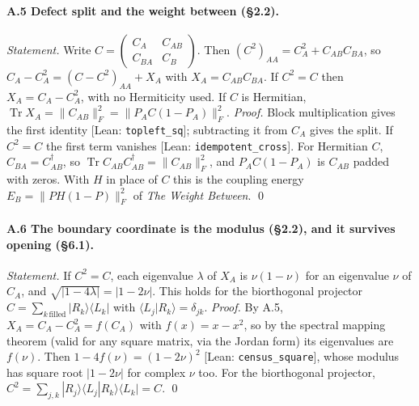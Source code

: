 \documentclass[11pt]{article}
\theoremstyle{definition}
\newcommand{\Tr}{\operatorname{Tr}}
\begin{document}
\paragraph{A.5 Defect split and the weight between (§2.2).}
\emph{Statement.} Write $C=\begin{pmatrix}C_A&C_{AB}\\C_{BA}&C_B\end{pmatrix}$. Then $(C^2)_{AA}=C_A^2+C_{AB}C_{BA}$, so $C_A-C_A^2=(C-C^2)_{AA}+X_A$ with $X_A=C_{AB}C_{BA}$. If $C^2=C$ then $X_A=C_A-C_A^2$, with no Hermiticity used. If $C$ is Hermitian, $\Tr X_A=\|C_{AB}\|_F^2=\|P_AC(1-P_A)\|_F^2$.
\emph{Proof.} Block multiplication gives the first identity \textsf{[Lean: \texttt{topleft\_sq}]}; subtracting it from $C_A$ gives the split. If $C^2=C$ the first term vanishes \textsf{[Lean: \texttt{idempotent\_cross}]}. For Hermitian $C$, $C_{BA}=C_{AB}^\dagger$, so $\Tr C_{AB}C_{AB}^\dagger=\|C_{AB}\|_F^2$, and $P_AC(1-P_A)$ is $C_{AB}$ padded with zeros. With $H$ in place of $C$ this is the coupling energy $E_B=\|PH(1-P)\|_F^2$ of \emph{The Weight Between}. \qed

\paragraph{A.6 The boundary coordinate is the modulus (§2.2), and it survives opening (§6.1).}
\emph{Statement.} If $C^2=C$, each eigenvalue $\lambda$ of $X_A$ is $\nu(1-\nu)$ for an eigenvalue $\nu$ of $C_A$, and $\sqrt{|1-4\lambda|}=|1-2\nu|$. This holds for the biorthogonal projector $C=\sum_{k\,\mathrm{filled}}|R_k\rangle\langle L_k|$ with $\langle L_j|R_k\rangle=\delta_{jk}$.
\emph{Proof.} By A.5, $X_A=C_A-C_A^2=f(C_A)$ with $f(x)=x-x^2$, so by the spectral mapping theorem (valid for any square matrix, via the Jordan form) its eigenvalues are $f(\nu)$. Then $1-4f(\nu)=(1-2\nu)^2$ \textsf{[Lean: \texttt{census\_square}]}, whose modulus has square root $|1-2\nu|$ for complex $\nu$ too. For the biorthogonal projector, $C^2=\sum_{j,k}|R_j\rangle\langle L_j|R_k\rangle\langle L_k|=C$. \qed
\end{document}
